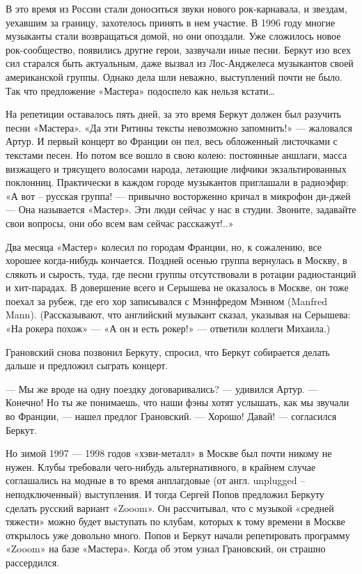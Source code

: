 \documentclass[16pt,a5paper]{book}
\begin{document}
В это время из России стали доноситься звуки нового рок-карнавала, и звездам, уехавшим за границу, захотелось принять в
нем участие. В 1996 году многие музыканты стали возвращаться домой, но они опоздали. Уже сложилось новое рок-сообщество,
появились другие герои, зазвучали иные песни. Беркут изо всех сил старался быть актуальным, даже вызвал из Лос-Анджелеса
музыкантов своей американской группы. Однако дела шли неважно, выступлений почти не было. Так что предложение «Мастера»
подоспело как нельзя кстати\ldots

На репетиции оставалось пять дней, за это время Беркут должен был разучить песни «Мастера». «Да эти Ритины тексты
невозможно запомнить!» — жаловался Артур. И первый концерт во Франции он пел, весь обложенный листочками с текстами
песен. Но потом все вошло в свою колею: постоянные аншлаги, масса визжащего и трясущего волосами народа, летающие
лифчики экзальтированных поклонниц. Практически в каждом городе музыкантов приглашали в радиоэфир: «А вот – русская
группа! — привычно восторженно кричал в микрофон ди-джей — Она называется «Мастер». Эти люди сейчас у нас в студии.
Звоните, задавайте свои вопросы, они обо всем вам сейчас расскажут!..»

Два месяца «Мастер» колесил по городам Франции, но, к сожалению, все хорошее когда-нибудь кончается. Поздней осенью
группа вернулась в Москву, в слякоть и сырость, туда, где песни группы отсутствовали в ротации радиостанций и
хит-парадах. В довершение всего и Серышева не оказалось в Москве, он тоже поехал за рубеж, где его хор записывался с
Мэннфредом Мэнном (Manfred Mann). (Рассказывают, что английский музыкант сказал, указывая на Серышева: «На рокера похож»
— «А он и есть рокер!» — ответили коллеги Михаила.)

Грановский снова позвонил Беркуту, спросил, что Беркут собирается делать дальше и предложил сыграть концерт.

— Мы же вроде на одну поездку договаривались? — удивился Артур.
— Конечно! Но ты же понимаешь, что наши фэны хотят услышать, как мы звучали во Франции, — нашел предлог Грановский.
— Хорошо! Давай! — согласился Беркут.

Но зимой 1997 — 1998 годов «хэви-металл» в Москве был почти никому не нужен. Клубы требовали чего-нибудь
альтернативного, в крайнем случае соглашались на модные в то время анплагдовые (от англ. unplugged – неподключенный)
выступления. И тогда Сергей Попов предложил Беркуту сделать русский вариант «Zooom». Он рассчитывал, что с музыкой
«средней тяжести» можно будет выступать по клубам, которых к тому времени в Москве открылось уже довольно много. Попов и
Беркут начали репетировать программу «Zooom» на базе «Мастера». Когда об этом узнал Грановский, он страшно рассердился.
\end{document}
